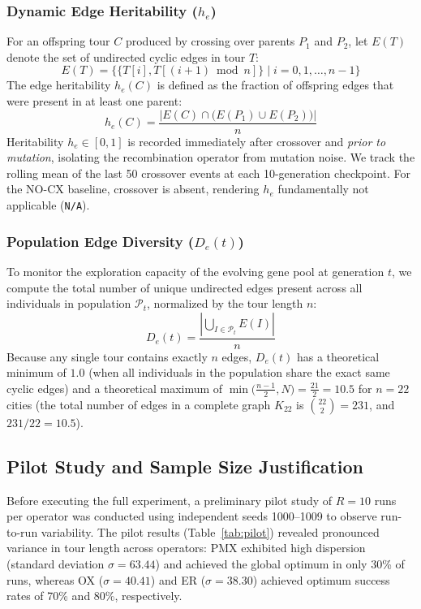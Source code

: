 \documentclass[10pt,a4paper]{article}
\begin{document}
\subsubsection{Dynamic Edge Heritability ($h_e$)}
For an offspring tour $C$ produced by crossing over parents $P_1$ and $P_2$, let $E(T)$ denote the set of undirected cyclic edges in tour $T$:
\begin{equation}
E(T) = \big\{ \{T[i], T[(i+1) \bmod n]\} \;\big|\; i = 0, 1, \dots, n-1 \big\}
\end{equation}
The edge heritability $h_e(C)$ is defined as the fraction of offspring edges that were present in at least one parent:
\begin{equation}
\label{eq:he}
h_e(C) = \frac{\big| E(C) \cap \big( E(P_1) \cup E(P_2) \big) \big|}{n}
\end{equation}
Heritability $h_e \in [0, 1]$ is recorded immediately after crossover and \emph{prior to mutation}, isolating the recombination operator from mutation noise. We track the rolling mean of the last 50 crossover events at each 10-generation checkpoint. For the NO-CX baseline, crossover is absent, rendering $h_e$ fundamentally not applicable (\texttt{N/A}).

\subsubsection{Population Edge Diversity ($D_e(t)$)}
To monitor the exploration capacity of the evolving gene pool at generation $t$, we compute the total number of unique undirected edges present across all individuals in population $\mathcal{P}_t$, normalized by the tour length $n$:
\begin{equation}
\label{eq:de}
D_e(t) = \frac{\left| \bigcup_{I \in \mathcal{P}_t} E(I) \right|}{n}
\end{equation}
Because any single tour contains exactly $n$ edges, $D_e(t)$ has a theoretical minimum of $1.0$ (when all individuals in the population share the exact same cyclic edges) and a theoretical maximum of $\min\big( \frac{n-1}{2}, N \big) = \frac{21}{2} = 10.5$ for $n=22$ cities (the total number of edges in a complete graph $K_{22}$ is $\binom{22}{2} = 231$, and $231 / 22 = 10.5$).

\subsection{Pilot Study and Sample Size Justification}
\label{sec:pilot}

Before executing the full experiment, a preliminary pilot study of $R = 10$ runs per operator was conducted using independent seeds 1000--1009 to observe run-to-run variability. The pilot results (Table~\ref{tab:pilot}) revealed pronounced variance in tour length across operators: PMX exhibited high dispersion (standard deviation $\sigma = 63.44$) and achieved the global optimum in only 30\% of runs, whereas OX ($\sigma = 40.41$) and ER ($\sigma = 38.30$) achieved optimum success rates of 70\% and 80\%, respectively.
\end{document}
